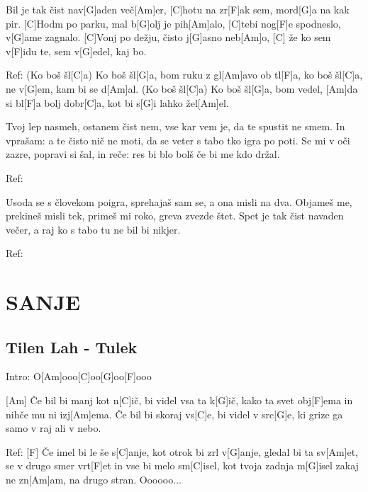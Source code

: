 \documentclass{article}
\begin{document}
\begin{multicols}{2}
\begin{guitar}
	[C]Bil je tak čist nav[G]aden več[Am]er,
	[C]hotu na zr[F]ak sem, mord[G]a na kak pir.
	[C]Hodm po parku, mal b[G]olj je pih[Am]alo,
	[C]tebi nog[F]e spodneslo, v[G]ame zagnalo.
	[C]Vonj po dežju, čisto j[G]asno neb[Am]o,
	[C] že ko sem v[F]idu te, sem v[G]edel, kaj bo.
	\linebreak
	
	Ref:
	(Ko boš šl[C]a) Ko boš šl[G]a, bom ruku z gl[Am]avo ob tl[F]a,
	ko boš šl[C]a, ne v[G]em, kam bi se d[Am]al.
	(Ko boš šl[C]a) Ko boš šl[G]a, bom vedel, [Am]da si bl[F]a bolj dobr[C]a,
	kot bi s[G]i lahko žel[Am]el.
	\linebreak

	Tvoj lep nasmeh, ostanem čist nem,
	vse kar vem je, da te spustit ne smem.
	In vprašam: a te čisto nič ne moti, da se
	veter s tabo tko igra po poti.
	Se mi v oči zazre, popravi si šal, in reče:
	res bi blo bolš če bi me kdo držal.
	\linebreak

	Ref:
	\linebreak

	Usoda se s človekom poigra,
	sprehajaš sam se, a ona misli na dva.
	Objameš me, prekineš misli tek,
	primeš mi roko, greva zvezde štet.
	Spet je tak čist navaden večer,
	a raj ko s tabo tu ne bil bi nikjer.
	\linebreak

	Ref:

\end{guitar}
\pagebreak

\section*{SANJE}
%
\subsection*{Tilen Lah - Tulek}
\begin{guitar}

	Intro: O[Am]ooo[C]oo[G]oo[F]ooo

	[Am] Če bil bi manj kot n[C]ič, bi videl vsa ta k[G]ič,
	kako ta svet obj[F]ema in nihče mu ni izj[Am]ema.
	Če bil bi skoraj vs[C]e, bi videl v src[G]e,
	ki grize ga samo v raj ali v nebo.
	\linebreak

	Ref:
	[F] Če imel bi le še s[C]anje,
	kot otrok bi zrl v[G]anje,
	gledal bi ta sv[Am]et, se v drugo smer vrt[F]et
	in vse bi melo sm[C]isel, kot tvoja zadnja m[G]isel
	zakaj ne zn[Am]am, na drugo stran.
	Oooooo...
	\linebreak


\end{guitar}
\end{multicols}
\end{document}
